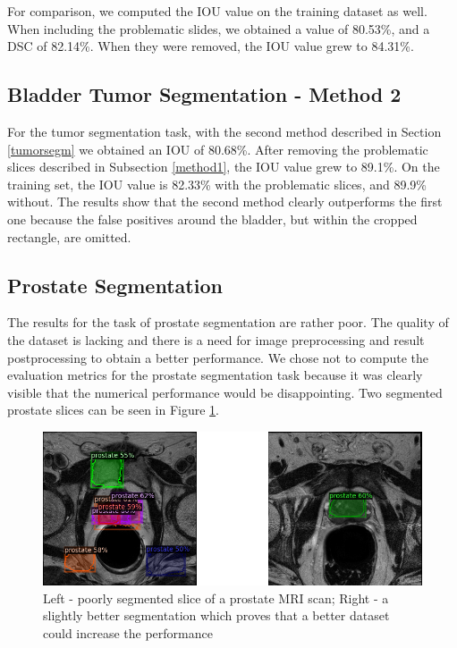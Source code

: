\documentclass[runningheads,a4paper,11pt]{report}
\begin{document}
For comparison, we computed the IOU value on the training dataset as well. When including the problematic slides, we obtained a value of 80.53\%, and a DSC of 82.14\%. When they were removed, the IOU value grew to 84.31\%.

\subsection{Bladder Tumor Segmentation - Method 2}

For the tumor segmentation task, with the second method described in Section \ref{tumorsegm} we obtained an IOU of 80.68\%. After removing the problematic slices described in Subsection \ref{method1}, the IOU value grew to 89.1\%. On the training set, the IOU value is 82.33\% with the problematic slices, and 89.9\% without. The results show that the second method clearly outperforms the first one because the false positives around the bladder, but within the cropped rectangle, are omitted.

\subsection{Prostate Segmentation}

The results for the task of prostate segmentation are rather poor. The quality of the dataset is lacking and there is a need for image preprocessing and result postprocessing to obtain a better performance. We chose not to compute the evaluation metrics for the prostate segmentation task because it was clearly visible that the numerical performance would be disappointing. Two segmented prostate slices can be seen in Figure \ref{prostate2}.

\begin{figure}[htbp]
	\centerline{\includegraphics[width=17cm]{images/prostate2.png}}
	\caption{Left - poorly segmented slice of a prostate MRI scan; Right - a slightly better segmentation which proves that a better dataset could increase the performance}
	\label{prostate2}
\end{figure}
\end{document}
